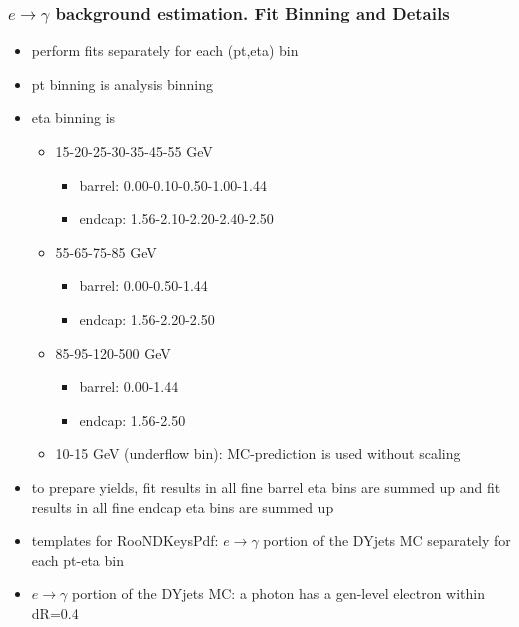 \begin{frame}\frametitle{$e\rightarrow\gamma$ background estimation. Fit Binning and Details}
\scriptsize
\begin{itemize}
  \item perform fits separately for each (pt,eta) bin
  \item pt binning is analysis binning
  \item eta binning is 
     \begin{itemize}
        \tiny
        \item 15-20-25-30-35-45-55 GeV
           \begin{itemize}
              \tiny
              \item barrel: 0.00-0.10-0.50-1.00-1.44
              \item endcap: 1.56-2.10-2.20-2.40-2.50
           \end{itemize}
        \item 55-65-75-85 GeV
          \begin{itemize}
              \tiny
              \item barrel: 0.00-0.50-1.44
              \item endcap: 1.56-2.20-2.50
           \end{itemize}
        \item 85-95-120-500 GeV
          \begin{itemize}
              \tiny
              \item barrel: 0.00-1.44
              \item endcap: 1.56-2.50
           \end{itemize}
        \item 10-15 GeV (underflow bin): MC-prediction is used without scaling
     \end{itemize}
  \item to prepare yields, fit results in all fine barrel eta bins are summed up and fit results in all fine endcap eta bins are summed up
  \item templates for RooNDKeysPdf: $e\rightarrow\gamma$ portion of the DYjets MC separately for each pt-eta bin
  \item $e\rightarrow\gamma$ portion of the DYjets MC: a photon has a gen-level electron within dR=0.4 
\end{itemize}
\end{frame}%

